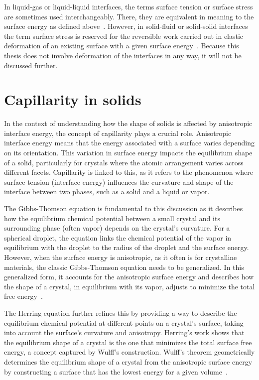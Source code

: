 In liquid-gas or liquid-liquid interfaces, the terms surface tension or surface stress are sometimes used interchangeably. There, they are equivalent in meaning to the surface energy as defined above~\cite{Vermaak1968}. However, in solid-fluid or solid-solid interfaces the term surface stress is reserved for the reversible work carried out in elastic deformation of an existing surface with a given surface energy~\cite{Vermaak1968}. Because this thesis does not involve deformation of the interfaces in any way, it will not be discussed further.

\section{Capillarity in solids}
In the context of understanding how the shape of solids is affected by anisotropic interface energy, the concept of capillarity plays a crucial role. Anisotropic interface energy means that the energy associated with a surface varies depending on its orientation. This variation in surface energy impacts the equilibrium shape of a solid, particularly for crystals where the atomic arrangement varies across different facets. Capillarity is linked to this, as it refers to the phenomenon where surface tension (interface energy) influences the curvature and shape of the interface between two phases, such as a solid and a liquid or vapor.

The Gibbs-Thomson equation is fundamental to this discussion as it describes how the equilibrium chemical potential between a small crystal and its surrounding phase (often vapor) depends on the crystal’s curvature. For a spherical droplet, the equation links the chemical potential of the vapor in equilibrium with the droplet to the radius of the droplet and the surface energy. However, when the surface energy is anisotropic, as it often is for crystalline materials, the classic Gibbs-Thomson equation needs to be generalized. In this generalized form, it accounts for the anisotropic surface energy and describes how the shape of a crystal, in equilibrium with its vapor, adjusts to minimize the total free energy~\cite{Johnson1965, Steinbach2023}.

The Herring equation further refines this by providing a way to describe the equilibrium chemical potential at different points on a crystal’s surface, taking into account the surface’s curvature and anisotropy. Herring’s work shows that the equilibrium shape of a crystal is the one that minimizes the total surface free energy, a concept captured by Wulff’s construction. Wulff’s theorem geometrically determines the equilibrium shape of a crystal from the anisotropic surface energy by constructing a surface that has the lowest energy for a given volume~\cite{Johnson1965}.

